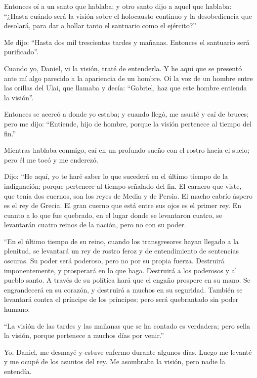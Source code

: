  Entonces oí a un santo que hablaba; y otro santo dijo a
aquel que hablaba: ``¿Hasta cuándo será la visión sobre el holocausto
continuo y la desobediencia que desolará, para dar a hollar tanto el
santuario como el ejército?''

 Me dijo: ``Hasta dos mil trescientas tardes y mañanas.
Entonces el santuario será purificado''.

 Cuando yo, Daniel, vi la visión, traté de entenderla. Y
he aquí que se presentó ante mí algo parecido a la apariencia de un
hombre.  Oí la voz de un hombre entre las orillas del
Ulai, que llamaba y decía: ``Gabriel, haz que este hombre entienda la
visión''.

 Entonces se acercó a donde yo estaba; y cuando llegó, me
asusté y caí de bruces; pero me dijo: ``Entiende, hijo de hombre, porque
la visión pertenece al tiempo del fin.''

 Mientras hablaba conmigo, caí en un profundo sueño con
el rostro hacia el suelo; pero él me tocó y me enderezó.

 Dijo: ``He aquí, yo te haré saber lo que sucederá en el
último tiempo de la indignación; porque pertenece al tiempo señalado del
fin.  El carnero que viste, que tenía dos cuernos, son
los reyes de Media y de Persia.  El macho cabrío áspero
es el rey de Grecia. El gran cuerno que está entre sus ojos es el primer
rey.  En cuanto a lo que fue quebrado, en el lugar donde
se levantaron cuatro, se levantarán cuatro reinos de la nación, pero no
con su poder.

 ``En el último tiempo de su reino, cuando los
transgresores hayan llegado a la plenitud, se levantará un rey de rostro
feroz y de entendimiento de sentencias oscuras.  Su poder
será poderoso, pero no por su propia fuerza. Destruirá imponentemente, y
prosperará en lo que haga. Destruirá a los poderosos y al pueblo santo.
 A través de su política hará que el engaño prospere en
su mano. Se engrandecerá en su corazón, y destruirá a muchos en su
seguridad. También se levantará contra el príncipe de los príncipes;
pero será quebrantado sin poder humano.

 ``La visión de las tardes y las mañanas que se ha
contado es verdadera; pero sella la visión, porque pertenece a muchos
días por venir.''

 Yo, Daniel, me desmayé y estuve enfermo durante algunos
días. Luego me levanté y me ocupé de los asuntos del rey. Me asombraba
la visión, pero nadie la entendía.


